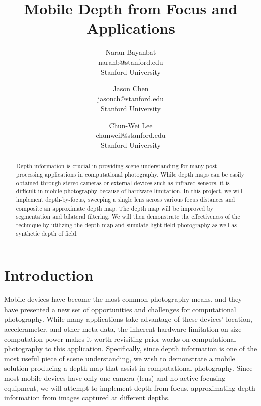 \documentclass[annual]{acmsiggraph}
\title{Mobile Depth from Focus and Applications}
\author{Naran Bayanbat\\naranb@stanford.edu\\Stanford University \and Jason Chen\\jasonch@stanford.edu\\Stanford University \and Chun-Wei Lee\\chunweil@stanford.edu\\Stanford University}
\begin{document}

\maketitle

\begin{abstract}
Depth information is crucial in providing scene understanding for many post-processing applications in computational photography. While depth maps can be easily obtained through stereo cameras or external devices such as infrared sensors, it is difficult in mobile photography because of hardware limitation. In this project, we will implement depth-by-focus, sweeping a single lens across various focus distances and composite an approximate depth map. The depth map will be improved by segmentation and bilateral filtering. We will then demonstrate the effectiveness of the technique by utilizing the depth map and simulate light-field photography as well as synthetic depth of field.

\end{abstract}

\begin{CRcatlist}
\end{CRcatlist}

\keywordlist


\copyrightspace

\section{Introduction}

Mobile devices have become the most common photography means, and they have presented a new set of opportunities and challenges for computational photography.  While many applications take advantage of these devices' location, accelerameter, and other meta data, the inherent hardware limitation on size computation power makes it worth revisiting prior works on computational photography to this application.  Specifically, since depth information is one of the most useful piece of scene understanding, we wish to demonstrate a mobile solution producing a depth map that assist in computational photography.  Since most mobile devices have only one camera (lens) and no active focusing equipment, we will attempt to implement depth from focus, approximating depth information from images captured at different depths. 
\end{document}
